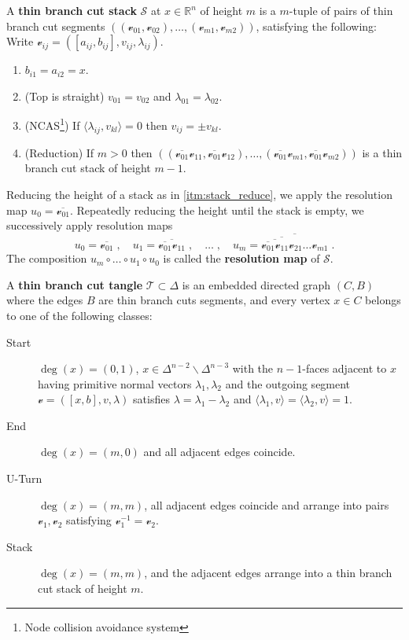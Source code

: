 \documentclass[12pt,a4paper,abstract=true,draft]{scrartcl}
\begin{document}
\begin{definition}
  \label{def:stack}
  A \textbf{thin branch cut stack} $𝒮$ at $x ∈ ℝ^n$ of height $m$ is a $m$-tuple of pairs of thin branch cut segments $((𝓋_{01},𝓋_{02}),…,(𝓋_{m1},𝓋_{m2}))$, satisfying the following:
  Write $𝓋_{ij} = ([a_{ij},b_{ij}],v_{ij},λ_{ij})$.
  \begin{enumerate}
    \item $b_{i1} = a_{i2} = x$.
    \item (Top is straight) $v_{01} = v_{02}$ and $λ_{01} = λ_{02}$.
    \item (NCAS\footnote{Node collision avoidance system}) If $⟨λ_{ij},v_{kl} ⟩ = 0$ then $v_{ij}= ± v_{kl}$.
    \item (Reduction) If $m>0$ then $((\overline{𝓋_{01}} 𝓋_{11}, \overline{𝓋_{01}} 𝓋_{12}), …, (\overline{𝓋_{01}} 𝓋_{m1}, \overline{𝓋_{01}} 𝓋_{m2}))$ is a thin branch cut stack of height $m-1$.\label{itm:stack_reduce}
  \end{enumerate}

  Reducing the height of a stack as in \cref{itm:stack_reduce}, we apply the resolution map $u_0 = \overline{𝓋_{01}}$.
  Repeatedly reducing the height until the stack is empty, we successively apply resolution maps
  \[
    u_0 = \overline{𝓋_{01}}\;, \quad
    u_1 = \overline{\overline{𝓋_{01}} 𝓋_{11}}\;, \quad
    …\;, \quad
    u_m = \overline{\overline{\overline{\overline{ 𝓋_{01}} 𝓋_{11}} 𝓋_{21}} … 𝓋_{m1}} \;.
  \]
  The composition $u_m ∘ … ∘ u_1 ∘ u_0$ is called the \textbf{resolution map} of $𝒮$.
\end{definition}

\begin{definition}
  \label{def:bct}
  A \textbf{thin branch cut tangle} $𝒯 ⊂ Δ$ is an embedded directed graph $(C,B)$ where the edges $B$ are thin branch cuts segments, and every vertex $x ∈ C$ belongs to one of the following classes:
  \begin{description}
    \item[Start] $\deg(x) = (0,1)$, $x ∈ Δ^{n-2} ∖ Δ^{n-3}$ with the $n-1$-faces adjacent to $x$ having primitive normal vectors $λ_1,λ_2$ and the outgoing segment $𝓋 = ([x,b],v,λ)$ satisfies $λ = λ_1-λ_2$ and $⟨λ_1,v ⟩ = ⟨ λ_2,v ⟩ = 1$.
    \item[End] $\deg(x) = (m,0)$ and all adjacent edges coincide.
    \item[U-Turn] $\deg(x) = (m,m)$, all adjacent edges coincide and arrange into pairs $𝓋_1, 𝓋_2$ satisfying $𝓋_1^{-1} = 𝓋_2$.
    \item[Stack] $\deg(x) = (m,m)$, and the adjacent edges arrange into a thin branch cut stack of height $m$.
  \end{description}
\end{definition}
\end{document}
